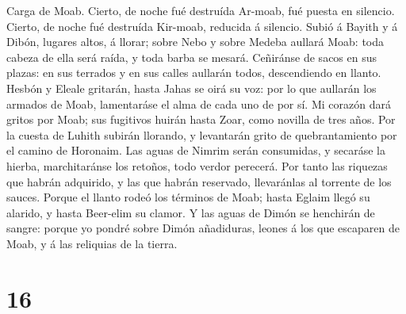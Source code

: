  Carga de Moab. Cierto, de noche fué destruída Ar-moab,
fué puesta en silencio. Cierto, de noche fué destruída Kir-moab,
reducida á silencio.  Subió á Bayith y á Dibón, lugares
altos, á llorar; sobre Nebo y sobre Medeba aullará Moab: toda cabeza de
ella será raída, y toda barba se mesará.  Ceñiránse de
sacos en sus plazas: en sus terrados y en sus calles aullarán todos,
descendiendo en llanto.  Hesbón y Eleale gritarán, hasta
Jahas se oirá su voz: por lo que aullarán los armados de Moab,
lamentaráse el alma de cada uno de por sí.  Mi corazón
dará gritos por Moab; sus fugitivos huirán hasta Zoar, como novilla de
tres años. Por la cuesta de Luhith subirán llorando, y levantarán grito
de quebrantamiento por el camino de Horonaim.  Las aguas
de Nimrim serán consumidas, y secaráse la hierba, marchitaránse los
retoños, todo verdor perecerá.  Por tanto las riquezas que
habrán adquirido, y las que habrán reservado, llevaránlas al torrente de
los sauces.  Porque el llanto rodeó los términos de Moab;
hasta Eglaim llegó su alarido, y hasta Beer-elim su clamor.
 Y las aguas de Dimón se henchirán de sangre: porque yo
pondré sobre Dimón añadiduras, leones á los que escaparen de Moab, y á
las reliquias de la tierra.

\hypertarget{section-15}{%
\section{16}\label{section-15}}

